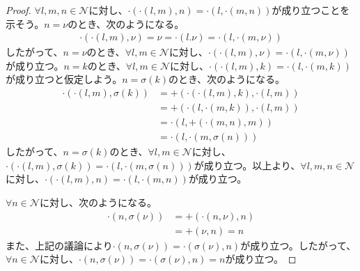 \documentclass[dvipdfmx]{jsarticle}
\begin{document}
\begin{proof}
$\forall l,m,n \in \mathcal{N}$に対し、$\cdot \left( \cdot (l,m),n \right) = \cdot \left( l, \cdot (m,n) \right)$が成り立つことを示そう。$n = \nu$のとき、次のようになる。
\begin{align*}
\cdot \left( \cdot (l,m),\nu \right) = \nu = \cdot (l.\nu) = \cdot \left( l, \cdot (m,\nu) \right)
\end{align*}
したがって、$n = \nu$のとき、$\forall l,m \in \mathcal{N}$に対し、$\cdot \left( \cdot (l,m),\nu \right) = \cdot \left( l, \cdot (m,\nu) \right)$が成り立つ。$n = k$のとき、$\forall l,m \in \mathcal{N}$に対し、$\cdot \left( \cdot (l,m),k \right) = \cdot \left( l, \cdot (m,k) \right)$が成り立つと仮定しよう。$n = \sigma(k)$のとき、次のようになる。
\begin{align*}
\cdot \left( \cdot (l,m),\sigma(k) \right) &= + \left( \cdot \left( \cdot (l,m),k \right), \cdot (l,m) \right)\\
&= + \left( \cdot \left( l, \cdot (m,k) \right), \cdot (l,m) \right)\\
&= \cdot \left( l, + \left( \cdot (m,n),m \right) \right)\\
&= \cdot \left( l, \cdot \left( m,\sigma(n) \right) \right)
\end{align*}
したがって、$n = \sigma(k)$のとき、$\forall l,m \in \mathcal{N}$に対し、$\cdot \left( \cdot (l,m),\sigma(k) \right) = \cdot \left( l, \cdot \left( m,\sigma(n) \right) \right)$が成り立つ。以上より、$\forall l,m,n \in \mathcal{N}$に対し、$\cdot \left( \cdot (l,m),n \right) = \cdot \left( l, \cdot (m,n) \right)$が成り立つ。\par
$\forall n \in \mathcal{N}$に対し、次のようになる。
\begin{align*}
\cdot \left( n,\sigma(\nu) \right) &= + \left( \cdot (n,\nu),n \right)\\
&= + (\nu,n) = n
\end{align*}
また、上記の議論により$\cdot \left( n,\sigma(\nu) \right) = \cdot \left( \sigma(\nu),n \right)$が成り立つ。したがって、$\forall n \in \mathcal{N}$に対し、$\cdot \left( n,\sigma(\nu) \right) = \cdot \left( \sigma(\nu),n \right) = n$が成り立つ。
\end{proof}
\end{document}
